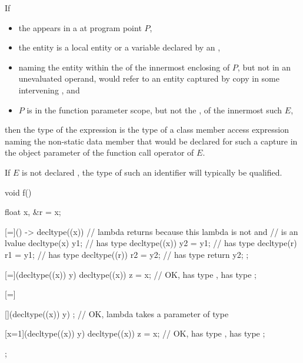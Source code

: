 \pnum
If
\begin{itemize}
\item
the 
appears in a 
at program point $P$,
\item
the entity is a local entity
or a variable declared by an ,
\item
naming the entity within the  of
the innermost enclosing  of $P$,
but not in an unevaluated operand, would refer to an entity captured by copy
in some intervening , and
\item
$P$ is in the function parameter scope,
but not the ,
of the innermost such  $E$,
\end{itemize}
then
the type of the expression is
the type of a class member access expression
naming the non-static data member
that would be declared for such a capture
in the object parameter of the function call operator of $E$.
\begin{note}
If $E$ is not declared ,
the type of such an identifier will typically be  qualified.
\end{note}

\begin{example}
\begin{codeblock}
void f() {
  float x, &r = x;

  [=]() -> decltype((x)) {      // lambda returns  because this lambda is not  and
                                //  is an lvalue
    decltype(x) y1;             //  has type 
    decltype((x)) y2 = y1;      //  has type 
    decltype(r) r1 = y1;        //  has type 
    decltype((r)) r2 = y2;      //  has type 
    return y2;
  };

  [=](decltype((x)) y) {
    decltype((x)) z = x;        // OK,  has type ,  has type 
  };

  [=] {
    [](decltype((x)) y) {};     // OK, lambda takes a parameter of type 

    [x=1](decltype((x)) y) {
      decltype((x)) z = x;      // OK,  has type ,  has type 
    };
  };
}
\end{codeblock}
\end{example}

